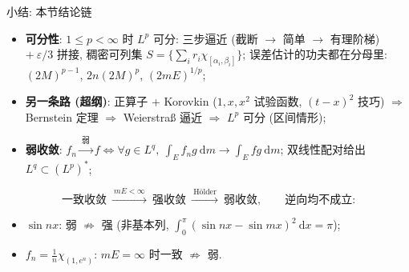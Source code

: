


\begin{frame}{小结: 本节结论链}

\begin{itemize}
\item \textbf{可分性}: $1 \leqslant p < \infty$ 时 $L^p$ 可分:
  三步逼近 (截断 $\to$ 简单 $\to$ 有理阶梯) $+\ \varepsilon/3$ 拼接,
  稠密可列集 $S = \big\{ \sum_i r_i \chi_{[\alpha_i, \beta_i]} \big\}$;
  误差估计的功夫都在分母里: $(2M)^{p-1}$, $2n(2M)^p$, $(2mE)^{1/p}$;
\item \textbf{另一条路 (超纲)}: 正算子 + Korovkin ($1, x, x^2$ 试验函数,
  $(t-x)^2$ 技巧) $\Rightarrow$ Bernstein 定理 $\Rightarrow$
  Weierstra\ss{} 逼近 $\Rightarrow$ $L^p$ 可分 (区间情形);
\item \textbf{弱收敛}: $f_n \xrightarrow{\ \text{弱}\ } f
  \iff \forall g \in L^q,\ \int_E f_n g ~ \mathrm{d} m \to \int_E f g ~ \mathrm{d} m$;
  双线性配对给出 $L^q \subset (L^p)^*$;
\end{itemize}

\pause

\[
\text{一致收敛}
\ \xrightarrow{\ mE < \infty\ }\
\text{强收敛}
\ \xrightarrow{\ \text{Hölder}\ }\
\text{弱收敛},
\qquad \text{逆向均不成立:}
\]
\begin{itemize}
\item $\sin nx$: 弱 $\not\Rightarrow$ 强
  (非基本列, $\int_0^{\pi} (\sin nx - \sin mx)^2 ~ \mathrm{d} x = \pi$);
\item $f_n = \frac{1}{n} \chi_{(1, e^n)}$: $mE = \infty$ 时一致 $\not\Rightarrow$ 弱.
\end{itemize}

\end{frame}



